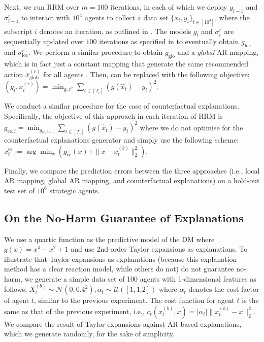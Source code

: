 Next, we run RRM over $m=100$ iterations, in each of which we deploy $g_{i-1}$ and $\sigma^r_{i-1}$ to interact with $10^4$ agents to collect a data set $\{x_t,y_t\}_{t\in[10^4]}$, where the subscript $i$ denotes an iteration, as outlined in . The models $g_i$ and $\sigma^r_i$ are sequentially updated over $100$ iterations as specified in  to eventually obtain $g_\text{loc}$ and $\sigma^r_\text{loc}$. We perform a similar procedure to obtain $g_\text{glo}$ and a \textit{global} AR mapping, which is in fact just a constant mapping that generate the same recommended action $x^{(r)}_\text{glob}$ for all agents . Then,  can be replaced with the following objective:
$(g_{i},x^{(r)}_{i})=\min_{g,x^{r}}\sum_{t\in[T_i]}\left(g(\hat{x}_t)-y_t\right)^2$.


We conduct a similar procedure for the case of counterfactual explanations. Specifically, the objective of this approach in each iteration of RRM is $g_{\text{ce},i}=\min_{g_{\text{ce},i-1}}\sum_{t\in[T_{i}]}(g(\hat{x}_t)-y_t)^2$
where we do not optimise for the counterfactual explanations generator and simply use the following scheme: $x^\text{ce}_t := \arg\min_{x}(g_\text{ce}(x) + \|x-x_t^{(b)}\|_2^2)$.

Finally, we compare the prediction errors between the three approaches (i.e., local AR mapping, global AR mapping, and counterfactual explanations) on a hold-out test set of $10^6$ strategic agents.


\subsection{On the No-Harm Guarantee of Explanations}
We use a quartic function as the predictive model of the DM where $g(x)=x^4-x^2+1$ and use 2nd-order Taylor expansions as explanations.
To illustrate that Taylor expansions \citep{xie2024non} as explanations (because this explanation method has a clear reaction model, while others do not) do not guarantee no-harm, we generate a simple data set of 100 agents with 1-dimensional features as follows: $X_t^{(b)} \sim \mathcal{N}(0,0.4^2), \alpha_t \sim \mathcal{U}([1,1.2])$ where $\alpha_t$ denotes the cost factor of agent $t$, similar to the previous experiment.
The cost function for agent $t$ is the same as that of the previous experiment, i.e., $c_t(x_t^{(b)},x)=|\alpha_t|\|x_t^{(b)}-x\|_2^2$. We compare the result of Taylor expansions against AR-based explanations, which we generate randomly, for the sake of simplicity.


